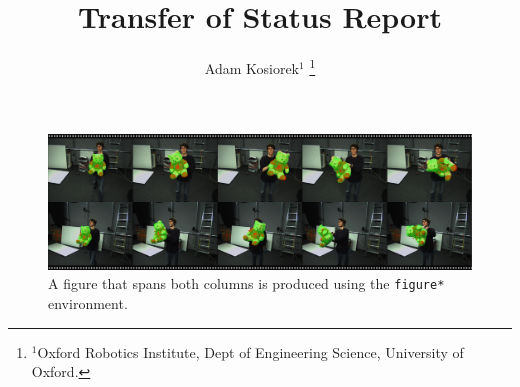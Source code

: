 \documentclass[a4paper, 10 pt, conference]{ieeeconf}
\title{\LARGE \bf
	Transfer of Status Report
}
\author{Adam Kosiorek$^{1}$
\thanks{$^{1}$Oxford Robotics Institute, Dept of Engineering Science, University
  of Oxford.}}
\begin{document}
\maketitle







\appendix



\begin{figure}[thpb]
      \centering
      \includegraphics[width=\textwidth]{Figs/wide.pdf}
      \caption{A figure that spans both columns is produced using the
        {\tt figure*} environment.}
      \label{fig:twocolfigure}
   \end{figure}

\printbibliography
\end{document}
